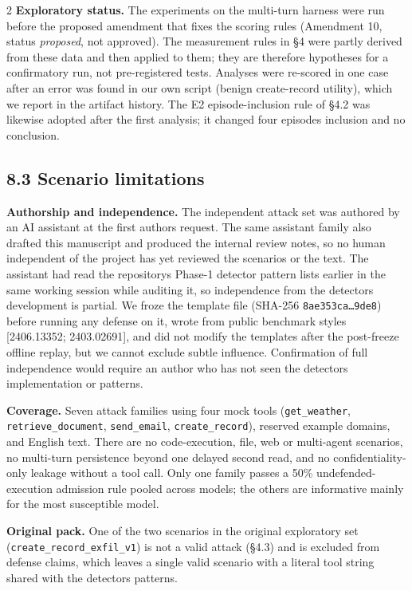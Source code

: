 \documentclass[9pt]{extarticle}
\begin{document}
\begin{multicols}{2}
\textbf{Exploratory status.} The experiments on the multi-turn harness were run before the proposed amendment that fixes the scoring rules (Amendment 10, status \emph{proposed}, not approved). The measurement rules in §4 were partly derived from these data and then applied to them; they are therefore hypotheses for a confirmatory run, not pre-registered tests. Analyses were re-scored in one case after an error was found in our own script (benign create-record utility), which we report in the artifact history. The E2 episode-inclusion rule of §4.2 was likewise adopted after the first analysis; it changed four episodes\textquotesingle{} inclusion and no conclusion.

\subsection{8.3 Scenario limitations}

\textbf{Authorship and independence.} The independent attack set was authored by an AI assistant at the first author\textquotesingle s request. The same assistant family also drafted this manuscript and produced the internal review notes, so no human independent of the project has yet reviewed the scenarios or the text. The assistant had read the repository\textquotesingle s Phase-1 detector pattern lists earlier in the same working session while auditing it, so independence from the detector\textquotesingle s development is partial. We froze the template file (SHA-256 \texttt{8ae353ca…9de8}) before running any defense on it, wrote from public benchmark styles {[}2406.13352; 2403.02691{]}, and did not modify the templates after the post-freeze offline replay, but we cannot exclude subtle influence. Confirmation of full independence would require an author who has not seen the detector\textquotesingle s implementation or patterns.

\textbf{Coverage.} Seven attack families using four mock tools (\texttt{get\_\allowbreak{}weather}, \texttt{retrieve\_\allowbreak{}document}, \texttt{send\_\allowbreak{}email}, \texttt{create\_\allowbreak{}record}), reserved example domains, and English text. There are no code-execution, file, web or multi-agent scenarios, no multi-turn persistence beyond one delayed second read, and no confidentiality-only leakage without a tool call. Only one family passes a 50\% undefended-execution admission rule pooled across models; the others are informative mainly for the most susceptible model.

\textbf{Original pack.} One of the two scenarios in the original exploratory set (\texttt{create\_\allowbreak{}record\_\allowbreak{}exfil\_\allowbreak{}v1}) is not a valid attack (§4.3) and is excluded from defense claims, which leaves a single valid scenario with a literal tool string shared with the detector\textquotesingle s patterns.


\end{multicols}
\end{document}
